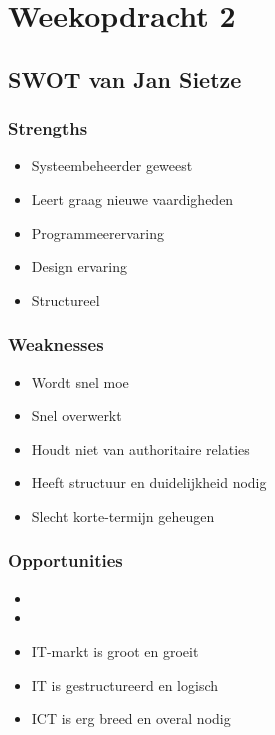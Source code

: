 
\chapter{Weekopdracht 2}

\section{SWOT van Jan Sietze}

\subsection{Strengths}

\begin{itemize}
\item
  Systeembeheerder geweest
\item
  Leert graag nieuwe vaardigheden
\item
  Programmeerervaring
\item
  Design ervaring
\item
  Structureel
\end{itemize}

\subsection{Weaknesses}

\begin{itemize}
\item
  Wordt snel moe
\item
  Snel overwerkt
\item
  Houdt niet van authoritaire relaties
\item
  Heeft structuur en duidelijkheid nodig
\item
  Slecht korte-termijn geheugen
\end{itemize}

\subsection{Opportunities}

\begin{itemize}
\item
  
\item
   
\item
  IT-markt is groot en groeit
\item
  IT is gestructureerd en logisch
\item
  ICT is erg breed en overal nodig
\end{itemize}

